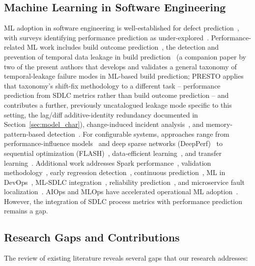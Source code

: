 \documentclass[technologies,article,submit,pdftex,moreauthors]{Definitions/mdpi}
\begin{document}
\subsection{Machine Learning in Software Engineering}\label{sec:rw_ml}

ML adoption in software engineering is well-established for defect
prediction~\cite{menzies2007, hall2012}, with surveys identifying
performance prediction as
under-explored~\cite{zhang2019, allamanis2018}. Performance-related ML
work includes build outcome prediction~\cite{chen2020buildfast}, the
detection and prevention of temporal data leakage in build
prediction~\cite{mishra2026leakage} (a companion paper by two of the
present authors that develops and validates a general taxonomy of
temporal-leakage failure modes in ML-based build prediction; PRESTO
applies that taxonomy's shift-fix methodology to a different task --
performance prediction from SDLC metrics rather than build outcome
prediction -- and contributes a further, previously uncatalogued
leakage mode specific to this setting, the lag/diff additive-identity
redundancy documented in Section~\ref{sec:model_char}), change-induced incident
analysis~\cite{wu2023incidents}, and memory-pattern-based
detection~\cite{nistor2013}. For configurable systems, approaches range
from performance-influence models~\cite{siegmund2015} and deep sparse
networks (DeepPerf)~\cite{ha2019} to sequential optimization
(FLASH)~\cite{nair2020}, data-efficient learning~\cite{guo2018}, and
transfer learning~\cite{jamshidi2017, jamshidi2018}. Additional work
addresses Spark performance~\cite{sparkml2019}, validation
methodology~\cite{tantithamthavorn2016}, early regression
detection~\cite{earlydetection2024}, continuous
prediction~\cite{pace2023}, ML in DevOps~\cite{mldevops2022}, ML-SDLC
integration~\cite{mlsdlc2024}, reliability
prediction~\cite{reliability2025}, and microservice fault
localization~\cite{zhou2019}. AIOps and MLOps have accelerated
operational ML adoption~\cite{dang2019, notaro2021, diazdearcaya2024}.
However, the integration of SDLC process metrics with performance
prediction remains a gap.

\subsection{Research Gaps and Contributions}\label{sec:rw_gaps}

The review of existing literature reveals several gaps that our research
addresses:
\end{document}
